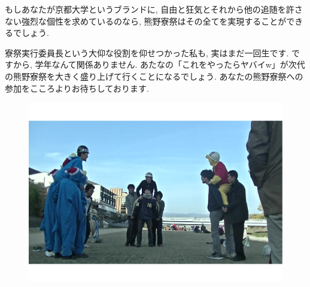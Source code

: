 \documentclass[10pt,b5jsbook,dvips,dvipdfmx,openany]{jsbook}
\theoremstyle{definition}
\begin{document}
			もしあなたが京都大学というブランドに, 自由と狂気とそれから他の追随を許さない強烈な個性を求めているのなら, 熊野寮祭はその全てを実現することができるでしょう.

			寮祭実行委員長という大仰な役割を仰せつかった私も, 実はまだ一回生です. ですから, 学年なんて関係ありません. あたなの「これをやったらヤバイw」が次代の熊野寮祭を大きく盛り上げて行くことになるでしょう.
あなたの熊野寮祭への参加をこころよりお待ちしております.
\begin{figure}[h]
		\begin{flushleft}
 	 	\includegraphics[scale=0.25]{kibasen.pdf}
		\end{flushleft}
		\end{figure}
\end{document}
